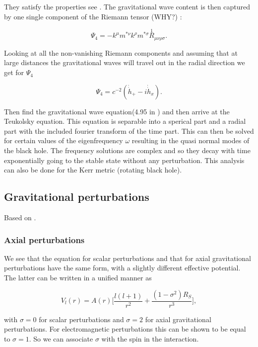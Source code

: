 \documentclass[12 pt]{article}
\begin{document}
	They satisfy the properties see \cite{creigthon}. The gravitational wave content is then captured by one single component of the Riemann tensor (WHY?) :
	
	\begin{equation}
		\Psi_4 = -k^{\mu} m^{*\nu} k^{\rho} m^{*\sigma} \stackrel{1}{R}_{\mu \nu \rho \sigma}.
	\end{equation}
	
	Looking at all the non-vanishing Riemann components and assuming that at large distances the gravitational waves will travel out in the radial direction we get for $ \Psi_4$
	
	\begin{equation}
		\Psi_4 = c^{-2} ( \Dot{\Dot{h}}_{+} - i\Dot{\Dot{h}}_{x}) .
	\end{equation}
	
	Then find the gravitational wave equation(4.95 in \cite{creighton}) and then arrive at the Teukolsky equation. This equation is separable into a sperical part and a radial part with the included fourier transform of the time part. This can then be solved for certain values of the eigenfrequency $\omega$ resulting in the quasi normal modes of the black hole. The frequency solutions are complex and so they decay with time exponentially going to the stable state without any perturbation. This analysis can also be done for the Kerr metric (rotating black hole). 
	
	\subsection{Gravitational perturbations}
	Based on \cite{maggiore}.
	
	\subsubsection{Axial perturbations}
	We see that the equation for scalar perturbations and that for axial
	gravitational perturbations have the same form, with a slightly different
	effective potential. The latter can be written in a unified manner as
	
	\begin{equation}
		V_l(r) = A(r) \big[\frac{l(l+1)}{r^2} + \frac{(1-\sigma^2)R_S}{r^3} \big],
	\end{equation}
	
	with $\sigma = 0$ for scalar perturbations and $\sigma = 2 $ for axial gravitational perturbations. For electromagnetic perturbations this can be shown to be equal to $\sigma = 1$. So we can associate $\sigma$ with the spin in the interaction. 
	
\end{document}
